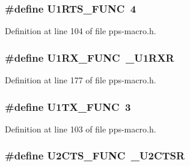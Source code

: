 \subsubsection[{U1\+R\+T\+S\+\_\+\+F\+U\+N\+C}]{\setlength{\rightskip}{0pt plus 5cm}\#define U1\+R\+T\+S\+\_\+\+F\+U\+N\+C~4}\label{pps-macro_8h_a86f7c4fcf36e022fae9045ef369c49a1}


Definition at line 104 of file pps-\/macro.\+h.

\hypertarget{pps-macro_8h_a0620a5e96079a9e856ae146d7f1f2f11}{}
\subsubsection[{U1\+R\+X\+\_\+\+F\+U\+N\+C}]{\setlength{\rightskip}{0pt plus 5cm}\#define U1\+R\+X\+\_\+\+F\+U\+N\+C~\+\_\+\+U1\+R\+X\+R}\label{pps-macro_8h_a0620a5e96079a9e856ae146d7f1f2f11}


Definition at line 177 of file pps-\/macro.\+h.

\hypertarget{pps-macro_8h_a2292fcf23da81bb46fbe6cfe37c0d071}{}
\subsubsection[{U1\+T\+X\+\_\+\+F\+U\+N\+C}]{\setlength{\rightskip}{0pt plus 5cm}\#define U1\+T\+X\+\_\+\+F\+U\+N\+C~3}\label{pps-macro_8h_a2292fcf23da81bb46fbe6cfe37c0d071}


Definition at line 103 of file pps-\/macro.\+h.

\hypertarget{pps-macro_8h_a38b345c7311932386c170318a99503f9}{}
\subsubsection[{U2\+C\+T\+S\+\_\+\+F\+U\+N\+C}]{\setlength{\rightskip}{0pt plus 5cm}\#define U2\+C\+T\+S\+\_\+\+F\+U\+N\+C~\+\_\+\+U2\+C\+T\+S\+R}\label{pps-macro_8h_a38b345c7311932386c170318a99503f9}


